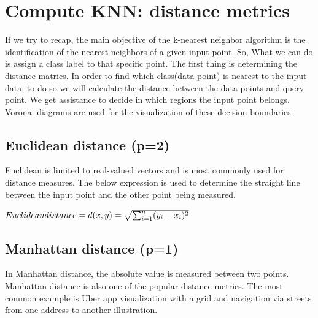\documentclass[conference]{IEEEtran}
\begin{document}




\section{Compute KNN: distance metrics}
If we try to recap, the main objective of the k-nearest neighbor algorithm is the identification of the nearest neighbors of a given input point. So, What we can do is assign a class label to that specific point. The first thing is determining the distance matrics. In order to find which class(data point) is nearest to the input data, to do so we will calculate the distance between the data points and query point. We get assistance to decide in which regions the input point belongs. Voronai diagrams are used for the visualization of these decision boundaries. 



\subsection{Euclidean distance (p=2)}
Euclidean is limited to real-valued vectors and is most commonly used for distance measures. The below expression is used to determine the straight line between the input point and the other point being measured.  


\begin{math}
\newline
 Euclidean distance = d(x,y)=\sqrt{\sum_{i=1}^{n} (y_{i} - x_{i})^2}
\end{math}


\subsection{Manhattan distance (p=1)}
In Manhattan distance, the absolute value is measured between two points. Manhattan distance is also one of the popular distance metrics. The most common example is Uber app visualization with a grid and navigation via streets from one address to another illustration.   
\end{document}
